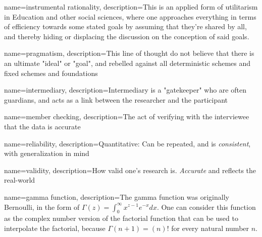 {
	name={instrumental rationality},
	description={This is an applied form of utilitarism in Education and other social sciences, where one approaches everything in terms of efficiency towards some stated goals by assuming that they're shared by all, and thereby hiding or displacing the discussion on the conception of said goals. \parencite{bredo_philosophies_2006}}
}

{
	name={pragmatism},
	description={This line of thought do not believe that there is an ultimate "ideal" or "goal", and rebelled against all deterministic schemes and fixed schemes and foundations\parencite{bredo_philosophies_2006}}
}


{
	name={intermediary},
	description={Intermediary is a "gatekeeper" who are often guardians,  and acts as a link between the researcher and the participant}
}

{
	name={member checking},
	description={The act of verifying with the interviewee that the data is accurate}
}

{
	name={reliability},
	description={Quantitative: Can be repeated, and is \emph{consistent}, with generalization in mind}
}

{
	name={validity},
	description={How valid one's research is. \emph{Accurate} and reflects the real-world}
}


{	
	name={gamma function},
	description={The gamma function was originally Bernoulli, in the form of $\Gamma(z) = \int_0^{\infty} x^{z-1} e^{-x} dx$. One can consider this function as the complex number version of the factorial function that can be used to interpolate the factorial, because $\Gamma(n+1) = (n)!$ for every natural number $n$.}
}